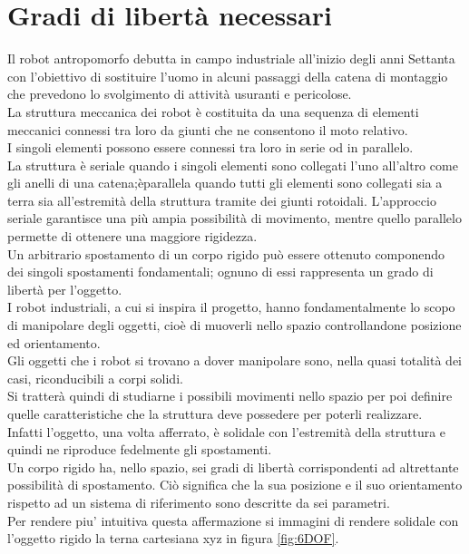 \documentclass[%
corpo=11pt,
twoside,
 stile=classica,
oldstyle,
greek,%
]{toptesi}
\begin{document}
	\section{Gradi di libertà necessari}
	Il robot antropomorfo debutta in campo industriale all’inizio degli anni Settanta con l’obiettivo di sostituire l’uomo in alcuni passaggi della catena di montaggio che prevedono lo svolgimento di attività usuranti e pericolose. \\
	La struttura meccanica dei robot è costituita da una sequenza di elementi meccanici connessi tra loro da giunti che ne consentono il moto relativo.\\
	 I singoli elementi possono essere connessi tra loro in serie od in parallelo.\\
	 La struttura è seriale quando i singoli elementi sono collegati l'uno all'altro come gli anelli di una catena;èparallela quando tutti gli elementi sono collegati sia a terra sia all'estremità della struttura tramite dei giunti rotoidali. L'approccio seriale garantisce una più ampia possibilità di movimento, mentre quello parallelo permette di ottenere una maggiore rigidezza.\\
	 Un arbitrario spostamento di un corpo rigido può essere ottenuto componendo dei singoli spostamenti fondamentali; ognuno di essi rappresenta un grado di libertà per l'oggetto. \\
	 I robot industriali, a cui si inspira il progetto, hanno fondamentalmente lo scopo di manipolare degli oggetti, cioè di muoverli nello spazio controllandone posizione ed orientamento.\\
	  Gli oggetti che i robot si trovano a dover manipolare sono, nella quasi totalità dei casi, riconducibili a corpi solidi. \\
	  Si tratterà quindi di studiarne i possibili movimenti nello spazio per poi definire quelle caratteristiche che la struttura deve possedere per poterli realizzare. \\
	  Infatti l'oggetto, una volta afferrato, è solidale con l'estremità della struttura e quindi ne riproduce fedelmente gli spostamenti. \\
	 Un corpo rigido ha, nello spazio, sei gradi di libertà corrispondenti ad altrettante possibilità di spostamento. 
	 Ciò significa che la sua posizione e il suo orientamento rispetto ad un sistema di riferimento sono descritte da sei parametri. \\
	 Per rendere piu' intuitiva questa affermazione si immagini di rendere solidale con l'oggetto rigido la terna cartesiana xyz in figura \ref{fig:6DOF}. \\
\end{document}
